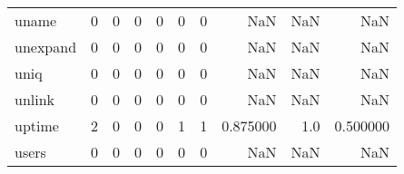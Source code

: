 \begin{tabular}{lrrrrrrrrr}
uname     &                                       0 &                                                  0 &                                                  0 &                                                  0 &                                                  0 &                                                  0 &                                                NaN &                                    NaN &                                  NaN \\
unexpand  &                                       0 &                                                  0 &                                                  0 &                                                  0 &                                                  0 &                                                  0 &                                                NaN &                                    NaN &                                  NaN \\
uniq      &                                       0 &                                                  0 &                                                  0 &                                                  0 &                                                  0 &                                                  0 &                                                NaN &                                    NaN &                                  NaN \\
unlink    &                                       0 &                                                  0 &                                                  0 &                                                  0 &                                                  0 &                                                  0 &                                                NaN &                                    NaN &                                  NaN \\
uptime    &                                       2 &                                                  0 &                                                  0 &                                                  0 &                                                  1 &                                                  1 &                                           0.875000 &                                    1.0 &                             0.500000 \\
users     &                                       0 &                                                  0 &                                                  0 &                                                  0 &                                                  0 &                                                  0 &                                                NaN &                                    NaN &                                  NaN \\

\end{tabular}
